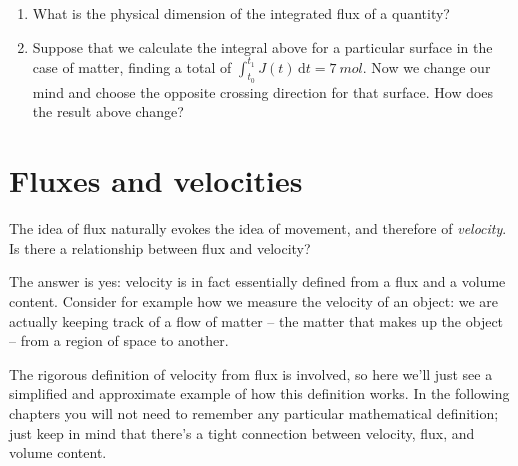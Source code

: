 \documentclass[a4paper,12pt,%
onecolumn,oneside,titlepage,%
british%
]{memoir}
\newcommand*{\di}{\mathrm{d}}%
\renewcommand*{\|}[1][]{\nonscript\:#1\vert\nonscript\:\mathopen{}}
\newcommand*{\yJ}{J}
\newcommand*{\yti}{t_{0}}
\newcommand*{\ytf}{t_{1}}
\begin{document}
\smallskip

\begin{exercise}
  \begin{enumerate}[exerc]
  \item What is the physical dimension of the integrated flux of a quantity?
  \item Suppose that we calculate the integral above for a particular surface in the case of matter, finding a total of $\int_{\yti}^{\ytf}\!\! \yJ(t)\,\di t = \qty{7}{mol}$. Now we change our mind and choose the opposite crossing direction for that surface. How does the result above change?
  \end{enumerate}
\end{exercise}

\section{Fluxes and velocities}
\label{sec:fluxes_velocities}

The idea of flux naturally evokes the idea of movement, and therefore of \emph{velocity}. Is there a relationship between flux and velocity?

The answer is yes: velocity is in fact essentially defined from a flux and a volume content. Consider for example how we measure the velocity of an object: we are actually keeping track of a flow of matter -- the matter that makes up the object -- from a region of space to another.

The rigorous definition of velocity from flux is involved, so here we'll just see a simplified and approximate example of how this definition works. In the following chapters you will not need to remember any particular mathematical definition; just keep in mind that there's a tight connection between velocity, flux, and volume content.
\end{document}
